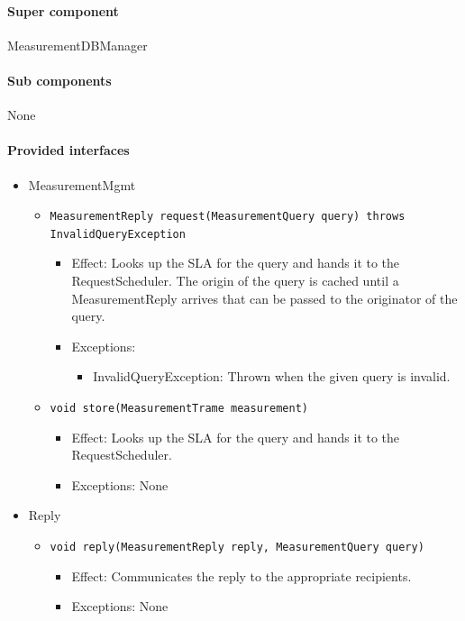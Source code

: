 \documentclass[a4paper,10pt]{article}
\begin{document}
\paragraph{Super component} MeasurementDBManager

\paragraph{Sub components} None

\paragraph{Provided interfaces}
\begin{itemize}
    \item MeasurementMgmt
    \begin{itemize}
        \item \texttt{MeasurementReply request(MeasurementQuery query) throws InvalidQueryException}
        \begin{itemize}
            \item Effect: Looks up the SLA for the query and hands it to the RequestScheduler. The origin of the query is cached until a MeasurementReply arrives that can be passed to the originator of the query.
            \item Exceptions:
            \begin{itemize}
                \item InvalidQueryException: Thrown when the given query is invalid.
            \end{itemize}
		\end{itemize}
        \item \texttt{void store(MeasurementTrame measurement)}
        \begin{itemize}
            \item Effect: Looks up the SLA for the query and hands it to the RequestScheduler.
            \item Exceptions: None
        \end{itemize}
    \end{itemize}

    \item Reply
    \begin{itemize}
        \item \texttt{void reply(MeasurementReply reply, MeasurementQuery query)}
        \begin{itemize}
            \item Effect: Communicates the reply to the appropriate recipients.
            \item Exceptions: None
        \end{itemize}
    \end{itemize}
\end{itemize}
\end{document}
